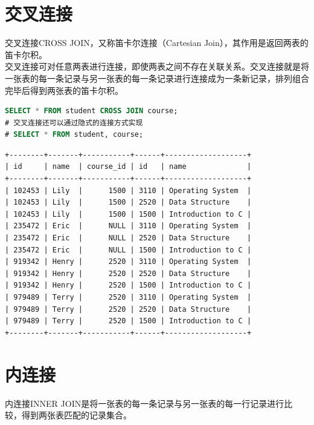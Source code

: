 \documentclass[12pt, openany, oneside]{book}
\begin{document}
\section{交叉连接}

交叉连接CROSS JOIN，又称笛卡尔连接（Cartesian Join），其作用是返回两表的笛卡尔积。 \\

交叉连接可对任意两表进行连接，即使两表之间不存在关联关系。交叉连接就是将一张表的每一条记录与另一张表的每一条记录进行连接成为一条新记录，排列组合完毕后得到两张表的笛卡尔积。 \\


\begin{lstlisting}[language=SQL]
SELECT * FROM student CROSS JOIN course;
# 交叉连接还可以通过隐式的连接方式实现
# SELECT * FROM student, course;
\end{lstlisting}

\begin{tcolorbox}
    \begin{verbatim}
+--------+-------+-----------+------+-------------------+
| id     | name  | course_id | id   | name              |
+--------+-------+-----------+------+-------------------+
| 102453 | Lily  |      1500 | 3110 | Operating System  |
| 102453 | Lily  |      1500 | 2520 | Data Structure    |
| 102453 | Lily  |      1500 | 1500 | Introduction to C |
| 235472 | Eric  |      NULL | 3110 | Operating System  |
| 235472 | Eric  |      NULL | 2520 | Data Structure    |
| 235472 | Eric  |      NULL | 1500 | Introduction to C |
| 919342 | Henry |      2520 | 3110 | Operating System  |
| 919342 | Henry |      2520 | 2520 | Data Structure    |
| 919342 | Henry |      2520 | 1500 | Introduction to C |
| 979489 | Terry |      2520 | 3110 | Operating System  |
| 979489 | Terry |      2520 | 2520 | Data Structure    |
| 979489 | Terry |      2520 | 1500 | Introduction to C |
+--------+-------+-----------+------+-------------------+
	\end{verbatim}
\end{tcolorbox}

\section{内连接}

内连接INNER JOIN是将一张表的每一条记录与另一张表的每一行记录进行比较，得到两张表匹配的记录集合。 \\
\end{document}
